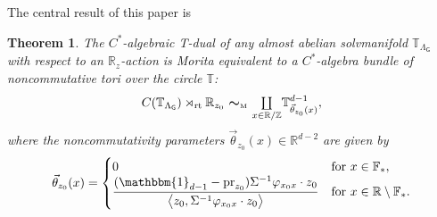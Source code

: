 \documentclass[10pt,a4paper]{amsart}
\numberwithin{equation}{section}
\newcommand{\Z}{\zed}
\newcommand{\F}{\mathbb{F}}
\newcommand{\mbf}[1]{{\boldsymbol {#1} }}
\newcommand{\unit}{\mathbbm{1}} 			%
\newcommand{\sfG}{\mathsf{G}}
\newcommand{\rt}{{\rm rt}}
\newcommand{\mcoprod}{\mbox{$\coprod\limits_{x\in\R/\Z}$}}
\newcommand{\R}{\real}
\newcommand{\zed}{{\mathbb Z}} %
\newcommand{\real}{{\mathbb R}} %
\newcommand{\torus}{{\mathbb T}} %
\newcommand{\proj}{{\rm pr}}
\newtheorem{Theorem}{Theorem}[section]
\begin{document}
The central result of this paper is

\begin{Theorem}
\label{thm:NCtorusbundlegen}
The $C^*$-algebraic T-dual of any almost abelian
solvmanifold $\torus_{\Lambda_\sfG}$ with respect to an $\R_z$-action
is Morita equivalent to a $C^*$-algebra bundle
of noncommutative tori over the circle $\torus$:
\begin{gather*}%
C(\torus_{\Lambda_\sfG})\rtimes_\rt\real_{ z_0}
 \ \mbf\sim_{\text{\tiny M}} \ \mcoprod
\torus^{d-1}_{\vec\theta_{z_0}(x)} ,
\end{gather*}
where the noncommutativity parameters $\vec\theta_{z_0}(x)\in\R^{d-2}$ are given
by
\begin{gather}\label{eq:thetaz0}
\vec\theta_{z_0}(x) = \begin{cases}
 0 & \mbox{for} \ x \in \F_* , \\
 \dfrac{(\unit_{d-1}-\proj_{ z_0}) \Sigma^{-1} \varphi_{x_0 x}\cdot
 z_0}{\big\langle{ z_0},\Sigma^{-1} \varphi_{x_0 x}\cdot z_0\big\rangle}
 & \mbox{for} \ x\in\R\setminus\F_* . \end{cases}
\end{gather}
\end{Theorem}
\end{document}
